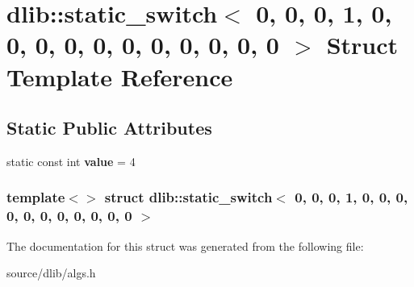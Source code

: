 \hypertarget{structdlib_1_1static__switch_3_010_00_010_00_010_00_011_00_010_00_010_00_010_00_010_00_010_00_017e7e1ea6f90a3743d68a10bc9ac43767}{
\section{dlib::static\_\-switch$<$ 0, 0, 0, 1, 0, 0, 0, 0, 0, 0, 0, 0, 0, 0, 0 $>$ Struct Template Reference}
\label{structdlib_1_1static__switch_3_010_00_010_00_010_00_011_00_010_00_010_00_010_00_010_00_010_00_017e7e1ea6f90a3743d68a10bc9ac43767}
}
\subsection*{Static Public Attributes}
\begin{DoxyCompactItemize}
\item 
\hypertarget{structdlib_1_1static__switch_3_010_00_010_00_010_00_011_00_010_00_010_00_010_00_010_00_010_00_017e7e1ea6f90a3743d68a10bc9ac43767_ad2f9fc307a9e7fbd1ac4b1a9f1f28e85}{
static const int {\bfseries value} = 4}
\label{structdlib_1_1static__switch_3_010_00_010_00_010_00_011_00_010_00_010_00_010_00_010_00_010_00_017e7e1ea6f90a3743d68a10bc9ac43767_ad2f9fc307a9e7fbd1ac4b1a9f1f28e85}

\end{DoxyCompactItemize}
\subsubsection*{template$<$$>$ struct dlib::static\_\-switch$<$ 0, 0, 0, 1, 0, 0, 0, 0, 0, 0, 0, 0, 0, 0, 0 $>$}



The documentation for this struct was generated from the following file:\begin{DoxyCompactItemize}
\item 
source/dlib/algs.h\end{DoxyCompactItemize}
